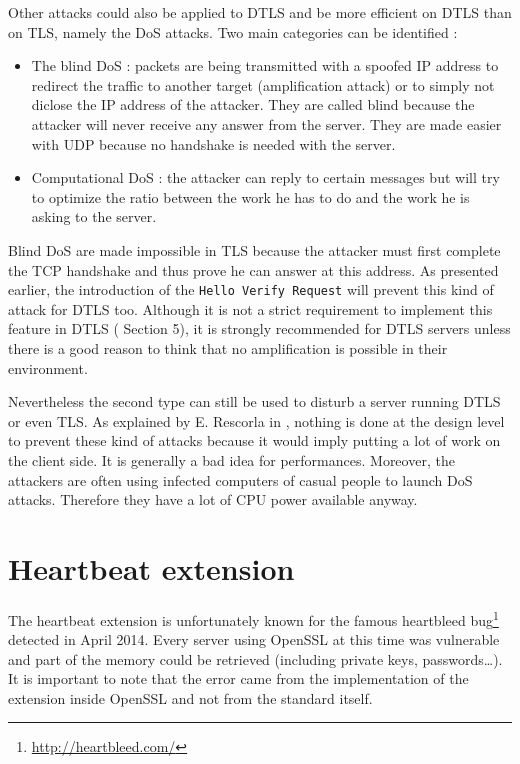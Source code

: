 Other attacks could also be applied to DTLS and be more efficient on DTLS than on TLS, namely the DoS attacks. Two main categories can be identified :

\begin{itemize}
\item The blind DoS : packets are being transmitted with a spoofed IP address to redirect the traffic to another target (amplification attack) or to simply not diclose the IP address of the attacker. They are called blind because the attacker will never receive any answer from the server. They are made easier with UDP because no handshake is needed with the server.
\item Computational DoS : the attacker can reply to certain messages but will try to optimize the ratio between the work he has to do and the work he is asking to the server.
\end{itemize}

Blind DoS are made impossible in TLS because the attacker must first complete the TCP handshake and thus prove he can answer at this address. As presented earlier, the introduction of the \texttt{Hello Verify Request} will prevent this kind of attack for DTLS too.  Although it is not a strict requirement to implement this feature in DTLS (\cite{rfc6347} Section 5), it is strongly recommended for DTLS servers  unless there is a good reason to think that no amplification is possible in their environment.

Nevertheless the second type can still be used to disturb a server running DTLS or even TLS. As explained by E. Rescorla in \cite{tls-dos}, nothing is done at the design level to prevent these kind of attacks because it would imply putting a lot of work on the client side. It is generally a bad idea for performances. Moreover, the attackers are often using infected computers of casual people to launch DoS attacks. Therefore they have a lot of CPU power available anyway.

\section{Heartbeat extension}

The heartbeat extension is unfortunately known for the famous heartbleed bug\footnote{\url{http://heartbleed.com/}} detected in April 2014. Every server using OpenSSL at this time was vulnerable and part of the memory could be retrieved (including private keys, passwords\dots). It is important to note that the error came from the implementation of the extension inside OpenSSL and not from the standard itself.

